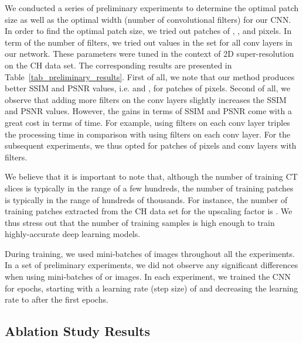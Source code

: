 \documentclass{ieeeaccess}
\begin{document}
We conducted a series of preliminary experiments to determine the optimal patch size as well as the optimal width (number of convolutional filters) for our CNN. In order to find the optimal patch size, we tried out patches of , ,  and  pixels. In term of the number of filters, we tried out values in the set  for all conv layers in our network. These parameters were tuned in the context of 2D super-resolution on the CH data set. The corresponding results are presented in Table~\ref{tab_preliminary_results}. First of all, we note that our method produces better SSIM and PSNR values, i.e.  and , for patches of  pixels. Second of all, we observe that adding more filters on the conv layers slightly increases the SSIM and PSNR values. However, the gains in terms of SSIM and PSNR come with a great cost in terms of time. For example, using  filters on each conv layer triples the processing time in comparison with using  filters on each conv layer. For the subsequent experiments, we thus opted for patches of  pixels and conv layers with  filters.

We believe that it is important to note that, although the number of training CT slices is typically in the range of a few hundreds, the number of training patches is typically in the range of hundreds of thousands. For instance, the number of  training patches extracted from the CH data set for the  upscaling factor is . We thus stress out that the number of training samples is high enough to train highly-accurate deep learning models.

During training, we used mini-batches of  images throughout all the experiments. In a set of preliminary experiments, we did not observe any significant differences when using mini-batches of  or  images. In each experiment, we trained the CNN for  epochs, starting with a learning rate (step size) of  and decreasing the learning rate to  after the first  epochs.

\subsection{Ablation Study Results}
\end{document}
